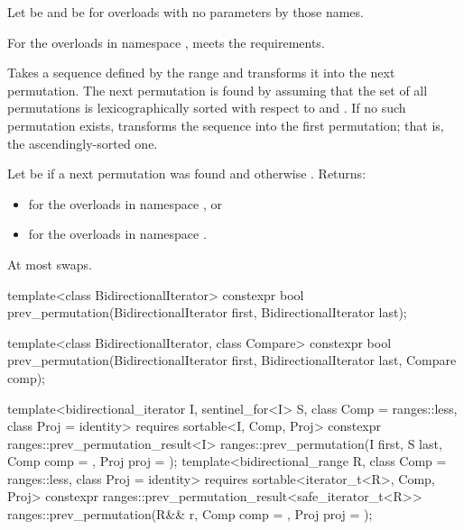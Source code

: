 \begin{itemdescr}
\pnum
Let  be 
and  be 
for overloads with no parameters by those names.

\pnum
\expects
For the overloads in namespace ,
 meets
the  requirements.

\pnum
\effects
Takes a sequence defined by the range 
and transforms it into the next permutation.
The next permutation is found by assuming that the set of all permutations
is lexicographically sorted with respect to  and .
If no such permutation exists,
transforms the sequence into the first permutation;
that is, the ascendingly-sorted one.

\pnum
\returns
Let  be  if a next permutation was found and
otherwise .
Returns:
\begin{itemize}
\item {} for the overloads in namespace , or
\item {} for the overloads in namespace .
\end{itemize}

\pnum
\complexity
At most  swaps.
\end{itemdescr}

%
\begin{itemdecl}
template<class BidirectionalIterator>
  constexpr bool prev_permutation(BidirectionalIterator first,
                                  BidirectionalIterator last);

template<class BidirectionalIterator, class Compare>
  constexpr bool prev_permutation(BidirectionalIterator first,
                                  BidirectionalIterator last, Compare comp);

template<bidirectional_iterator I, sentinel_for<I> S, class Comp = ranges::less,
         class Proj = identity>
  requires sortable<I, Comp, Proj>
  constexpr ranges::prev_permutation_result<I>
    ranges::prev_permutation(I first, S last, Comp comp = {}, Proj proj = {});
template<bidirectional_range R, class Comp = ranges::less,
         class Proj = identity>
  requires sortable<iterator_t<R>, Comp, Proj>
  constexpr ranges::prev_permutation_result<safe_iterator_t<R>>
    ranges::prev_permutation(R&& r, Comp comp = {}, Proj proj = {});
\end{itemdecl}

